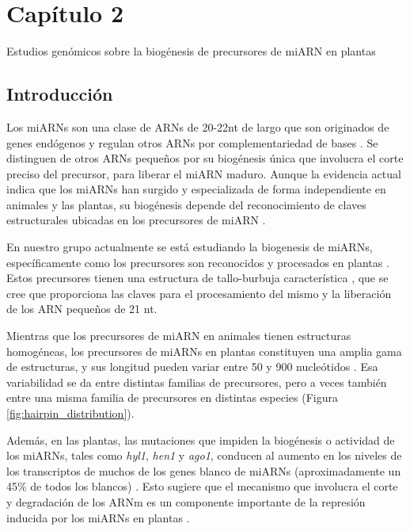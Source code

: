 
\graphicspath{{Chapter2/Figs/}}

\setcounter{chapter}{5}
\chapter*{Capítulo 2} 
\setcounter{figure}{0}
\setcounter{section}{0}

{\LARGE Estudios genómicos sobre la biogénesis de precursores de miARN en plantas}


\section{Introducción}
Los miARNs son una clase de ARNs de 20-22nt de largo que son originados de genes endógenos y regulan otros ARNs por complementariedad de bases \citep{Voinnet2009669}.
Se distinguen de otros ARNs pequeños por su biogénesis única que involucra el corte preciso del precursor, para liberar el miARN maduro.
Aunque la evidencia actual indica que los miARNs han surgido y especializada de forma independiente en animales y las plantas, su biogénesis depende del reconocimiento de claves estructurales ubicadas en los precursores de miARN \citep{pmid21554756,citeulike:8816489,Bologna11112012}.

En nuestro grupo actualmente se está estudiando la biogenesis de miARNs, específicamente como los precursores son reconocidos y procesados en plantas \citep{Bologna2013}.
Estos precursores tienen una estructura de tallo-burbuja característica \citep{Jones-Rhoades2006}, que se cree que proporciona las claves para el procesamiento del mismo y la liberación de los ARN pequeños de 21 nt.

Mientras que los precursores de miARN en animales tienen estructuras homogéneas, los precursores de miARNs en plantas constituyen una amplia gama de estructuras, y sus longitud pueden variar entre 50 y 900 nucleótidos \citep{Bologna2013,citeulike:8816489}.
Esa variabilidad se da entre distintas familias de precursores, pero a veces también entre una misma familia de precursores en distintas especies (Figura \ref{fig:hairpin_distribution}).

Además, en las plantas, las mutaciones que impiden la biogénesis o actividad de los miARNs, tales como \textit{hyl1}, \textit{hen1} y \textit{ago1}, conducen al aumento en los niveles de los transcriptos de muchos de los genes blanco de miARNs (aproximadamente un 45\% de todos los blancos) \citep{Han2004,pmid12747833,pmid16889646,Allen2005207}.
Esto sugiere que el mecanismo que involucra el corte y degradación de los ARNm es un componente importante de la represión inducida por los miARNs en plantas \citep{Jones-Rhoades2006, Voinnet2009669}.

